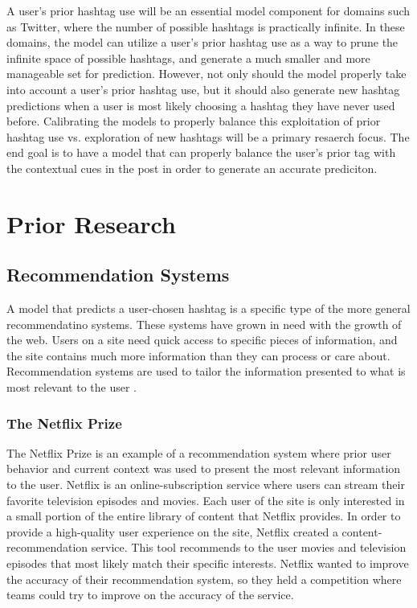 \documentclass[man]{apa6}
\begin{document}
A user's prior hashtag use will be an essential model component for domains such as Twitter, where the number of possible hashtags is practically infinite.
In these domains, the model can utilize a user's prior hashtag use as a way to prune the infinite space of possible hashtags, and generate a much smaller and more manageable set for prediction.
However, not only should the model properly take into account a user's prior hashtag use, but it should also generate new hashtag predictions when a user is most likely choosing a hashtag they have never used before.
Calibrating the models to properly balance this exploitation of prior hashtag use vs. exploration of new hashtags will be a primary resaerch focus.
The end goal is to have a model that can properly balance the user's prior tag with the contextual cues in the post in order to generate an accurate prediciton.

\section{Prior Research}

\subsection{Recommendation Systems}

A model that predicts a user-chosen hashtag is a specific type of the more general recommendatino systems.
These systems have grown in need with the growth of the web.
Users on a site need quick access to specific pieces of information, and the site contains much more information than they can process or care about.
Recommendation systems are used to tailor the information presented to what is most relevant to the user \parencite{Pazzani2007}.

\subsubsection{The Netflix Prize}

The Netflix Prize \parencite{Bennett2007} is an example of a recommendation system where prior user behavior and current context was used to present the most relevant information to the user.
Netflix is an online-subscription service where users can stream their favorite television episodes and movies.
Each user of the site is only interested in a small portion of the entire library of content that Netflix provides.
In order to provide a high-quality user experience on the site, Netflix created a content-recommendation service.
This tool recommends to the user movies and television episodes that most likely match their specific interests.
Netflix wanted to improve the accuracy of their recommendation system, so they held a competition where teams could try to improve on the accuracy of the service.
\end{document}
